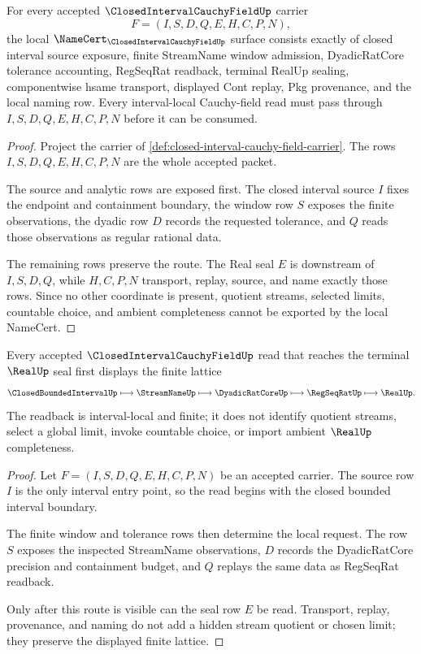 \begin{theorem}\label{thm:closed-interval-cauchy-field-namecert-obligations}
For every accepted $\ClosedIntervalCauchyFieldUp$ carrier
$$
F=(I,S,D,Q,E,H,C,P,N),
$$
the local $\NameCert_{\ClosedIntervalCauchyFieldUp}$ surface consists exactly of closed interval source exposure, finite StreamName window admission, DyadicRatCore tolerance accounting, RegSeqRat readback, terminal RealUp sealing, componentwise hsame transport, displayed Cont replay, Pkg provenance, and the local naming row. Every interval-local Cauchy-field read must pass through $I,S,D,Q,E,H,C,P,N$ before it can be consumed.
\end{theorem}
\begin{proof}
Project the carrier of \autoref{def:closed-interval-cauchy-field-carrier}. The rows $I,S,D,Q,E,H,C,P,N$ are the whole accepted packet.

The source and analytic rows are exposed first. The closed interval source $I$ fixes the endpoint and containment boundary, the window row $S$ exposes the finite observations, the dyadic row $D$ records the requested tolerance, and $Q$ reads those observations as regular rational data.

The remaining rows preserve the route. The Real seal $E$ is downstream of $I,S,D,Q$, while $H,C,P,N$ transport, replay, source, and name exactly those rows. Since no other coordinate is present, quotient streams, selected limits, countable choice, and ambient completeness cannot be exported by the local NameCert.
\end{proof}

\begin{theorem}\label{thm:closed-interval-cauchy-field-window-readback}
Every accepted $\ClosedIntervalCauchyFieldUp$ read that reaches the terminal $\RealUp$ seal first displays the finite lattice
$$
\ClosedBoundedIntervalUp \longmapsto \StreamNameUp \longmapsto \DyadicRatCoreUp \longmapsto \RegSeqRatUp \longmapsto \RealUp .
$$
The readback is interval-local and finite; it does not identify quotient streams, select a global limit, invoke countable choice, or import ambient $\RealUp$ completeness.
\end{theorem}
\begin{proof}
Let $F=(I,S,D,Q,E,H,C,P,N)$ be an accepted carrier. The source row $I$ is the only interval entry point, so the read begins with the closed bounded interval boundary.

The finite window and tolerance rows then determine the local request. The row $S$ exposes the inspected StreamName observations, $D$ records the DyadicRatCore precision and containment budget, and $Q$ replays the same data as RegSeqRat readback.

Only after this route is visible can the seal row $E$ be read. Transport, replay, provenance, and naming do not add a hidden stream quotient or chosen limit; they preserve the displayed finite lattice.
\end{proof}

